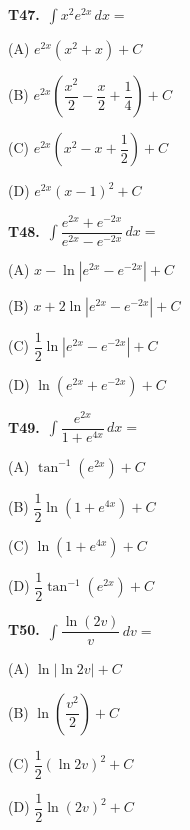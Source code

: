 \documentclass[11pt]{article}
\begin{document}
\bigskip\noindent\textbf{T47.}\ $\displaystyle\int x^2e^{2x}\,dx =$
\begin{list}{}{\setlength{\leftmargin}{3em}\setlength{\labelwidth}{2.5em}\setlength{\itemsep}{0pt}\setlength{\topsep}{2pt}}
\item[(A)] $e^{2x}(x^2+x)+C$
\item[(B)] $e^{2x}\left(\dfrac{x^2}{2}-\dfrac{x}{2}+\dfrac{1}{4}\right)+C$
\item[(C)] $e^{2x}\left(x^2-x+\dfrac{1}{2}\right)+C$
\item[(D)] $e^{2x}(x-1)^2+C$
\end{list}

\bigskip\noindent\textbf{T48.}\ $\displaystyle\int \dfrac{e^{2x}+e^{-2x}}{e^{2x}-e^{-2x}}\,dx =$
\begin{list}{}{\setlength{\leftmargin}{3em}\setlength{\labelwidth}{2.5em}\setlength{\itemsep}{0pt}\setlength{\topsep}{2pt}}
\item[(A)] $x-\ln|e^{2x}-e^{-2x}|+C$
\item[(B)] $x+2\ln|e^{2x}-e^{-2x}|+C$
\item[(C)] $\dfrac{1}{2}\ln|e^{2x}-e^{-2x}|+C$
\item[(D)] $\ln(e^{2x}+e^{-2x})+C$
\end{list}

\bigskip\noindent\textbf{T49.}\ $\displaystyle\int \dfrac{e^{2x}}{1+e^{4x}}\,dx =$
\begin{list}{}{\setlength{\leftmargin}{3em}\setlength{\labelwidth}{2.5em}\setlength{\itemsep}{0pt}\setlength{\topsep}{2pt}}
\item[(A)] $\tan^{-1}(e^{2x})+C$
\item[(B)] $\dfrac{1}{2}\ln(1+e^{4x})+C$
\item[(C)] $\ln(1+e^{4x})+C$
\item[(D)] $\dfrac{1}{2}\tan^{-1}(e^{2x})+C$
\end{list}

\bigskip\noindent\textbf{T50.}\ $\displaystyle\int \dfrac{\ln(2v)}{v}\,dv =$
\begin{list}{}{\setlength{\leftmargin}{3em}\setlength{\labelwidth}{2.5em}\setlength{\itemsep}{0pt}\setlength{\topsep}{2pt}}
\item[(A)] $\ln|\ln 2v|+C$
\item[(B)] $\ln\!\left(\dfrac{v^2}{2}\right)+C$
\item[(C)] $\dfrac{1}{2}(\ln 2v)^2+C$
\item[(D)] $\dfrac{1}{2}\ln(2v)^2+C$
\end{list}
\end{document}
